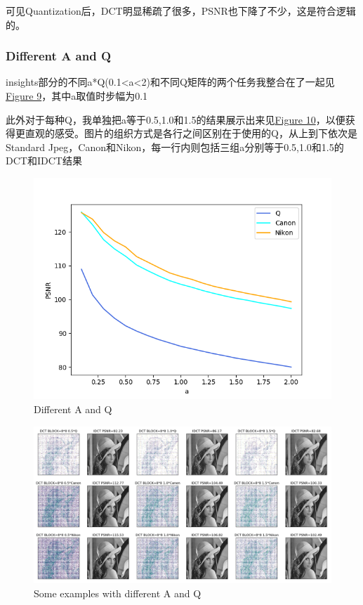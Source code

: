 \documentclass[UTF8]{ctexart}
\begin{document}
	可见Quantization后，DCT明显稀疏了很多，PSNR也下降了不少，这是符合逻辑的。
	
	\subsubsection{Different A and Q} 
	insights部分的不同a*Q(0.1<a<2)和不同Q矩阵的两个任务我整合在了一起见\hyperref[Fig.part2-1]{Figure 9}，其中a取值时步幅为0.1
	
	此外对于每种Q，我单独把a等于0.5,1.0和1.5的结果展示出来见\hyperref[Fig.part2-1-0]{Figure 10}，以便获得更直观的感受。图片的组织方式是各行之间区别在于使用的Q，从上到下依次是Standard Jpeg，Canon和Nikon，每一行内则包括三组a分别等于0.5,1.0和1.5的DCT和IDCT结果
	
	\begin{figure}[htbp]
		\centering
		\includegraphics[width=1.0\textwidth]{../part2-1.png}
		\caption{Different A and Q}
		\label{Fig.part2-1}
	\end{figure}
	
	
	\begin{figure}[htbp]
		\centering
		\includegraphics[width=1.0\textwidth]{../part2-1-0.png}
		\caption{Some examples with different A and Q}
		\label{Fig.part2-1-0}
	\end{figure}
	
\end{document}
